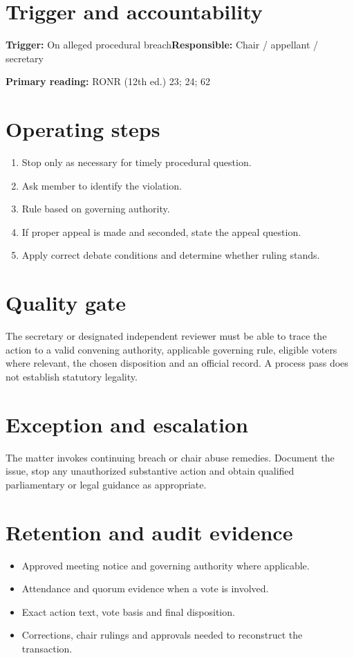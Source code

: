 \documentclass[11pt]{article}
\begin{document}
\SuiteOpen
{}
\section{Trigger and accountability}
\textbf{Trigger:} On alleged procedural breach\quad\textbf{Responsible:} Chair / appellant / secretary

\textbf{Primary reading:} RONR (12th ed.) 23; 24; 62

\section{Operating steps}
\begin{enumerate}[leftmargin=*,itemsep=4pt]
\item Stop only as necessary for timely procedural question.
\item Ask member to identify the violation.
\item Rule based on governing authority.
\item If proper appeal is made and seconded, state the appeal question.
\item Apply correct debate conditions and determine whether ruling stands.
\end{enumerate}

\section{Quality gate}
The secretary or designated independent reviewer must be able to trace the action to a valid convening authority, applicable governing rule, eligible voters where relevant, the chosen disposition and an official record. A process pass does not establish statutory legality.

\section{Exception and escalation}
The matter invokes continuing breach or chair abuse remedies. Document the issue, stop any unauthorized substantive action and obtain qualified parliamentary or legal guidance as appropriate.

\section{Retention and audit evidence}
\begin{itemize}[leftmargin=*,itemsep=4pt]
\item Approved meeting notice and governing authority where applicable.
\item Attendance and quorum evidence when a vote is involved.
\item Exact action text, vote basis and final disposition.
\item Corrections, chair rulings and approvals needed to reconstruct the transaction.
\end{itemize}
\end{document}
